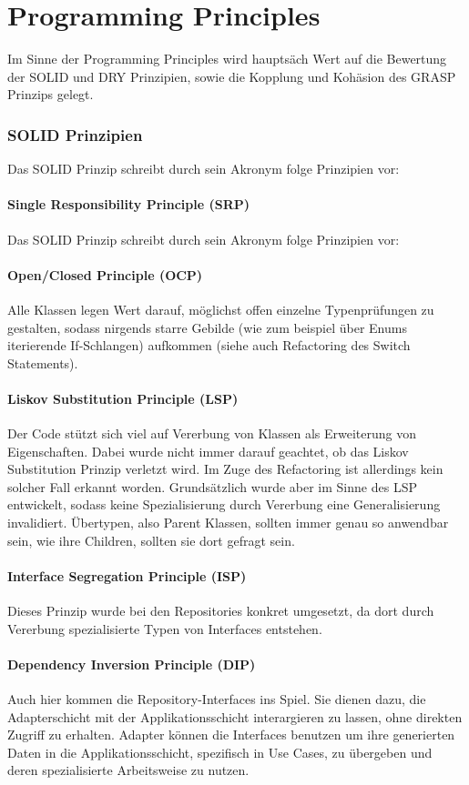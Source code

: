 \chapter{Programming Principles}

Im Sinne der Programming Principles wird hauptsäch Wert auf die Bewertung der SOLID und DRY Prinzipien, sowie die Kopplung und Kohäsion des GRASP Prinzips gelegt.

\subsection*{SOLID Prinzipien}
Das SOLID Prinzip schreibt durch sein Akronym folge Prinzipien vor:
\subsubsection*{Single Responsibility Principle (SRP)}
Das SOLID Prinzip schreibt durch sein Akronym folge Prinzipien vor:
\subsubsection*{Open/Closed Principle (OCP)}
Alle Klassen legen Wert darauf, möglichst offen einzelne Typenprüfungen zu gestalten, sodass nirgends starre Gebilde (wie zum beispiel über Enums iterierende If-Schlangen) aufkommen (siehe auch Refactoring des Switch Statements).
\subsubsection*{Liskov Substitution Principle (LSP)}
Der Code stützt sich viel auf Vererbung von Klassen als Erweiterung von Eigenschaften. Dabei wurde nicht immer darauf geachtet, ob das Liskov Substitution Prinzip verletzt wird. Im Zuge des Refactoring ist allerdings kein solcher Fall erkannt worden. Grundsätzlich wurde aber im Sinne des LSP entwickelt, sodass keine Spezialisierung durch Vererbung eine Generalisierung invalidiert. Übertypen, also Parent Klassen, sollten immer genau so anwendbar sein, wie ihre Children, sollten sie dort gefragt sein.
\subsubsection*{Interface Segregation Principle (ISP)}
Dieses Prinzip wurde bei den Repositories konkret umgesetzt, da dort durch Vererbung spezialisierte Typen von Interfaces entstehen.
\subsubsection*{Dependency Inversion Principle (DIP)}
Auch hier kommen die Repository-Interfaces ins Spiel. Sie dienen dazu, die Adapterschicht mit der Applikationsschicht interargieren zu lassen, ohne direkten Zugriff zu erhalten. Adapter können die Interfaces benutzen um ihre generierten Daten in die Applikationsschicht, spezifisch in Use Cases, zu übergeben und deren spezialisierte Arbeitsweise zu nutzen.

